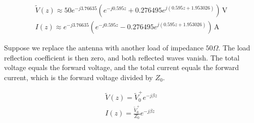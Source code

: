 \documentclass{ximera}
\begin{document}
\begin{example}
\begin{explanation}
\begin{eqnarray}
\tilde{V}(z)\approx50e^{-j3.76635}
\left(e^{-j0.595z}+0.276495e^{j(0.595z+1.953026)}\right)\,\mathrm{V} \\
I(z)\approx e^{-j3.76635}
\left(e^{-j0.595z}-0.276495e^{j(0.595z+1.953026)}\right)\,\mathrm{A}
\end{eqnarray}

Suppose we replace the antenna with another load of impedance
$50\Omega$. The load reflection coefficient is then zero, and
both reflected waves vanish. The total voltage equals the
forward voltage, and the total current equals the forward
current, which is the forward voltage divided by $Z_0$.


\begin{eqnarray}
\tilde{V}(z)= \tilde{V}_0^+ e^{-j \beta z}   \\
I(z)=   \frac{\tilde{V}_0^+}{Z_0}  e^{-j \beta z} 
\end{eqnarray}


\end{explanation}




\end{example}
\end{document}
